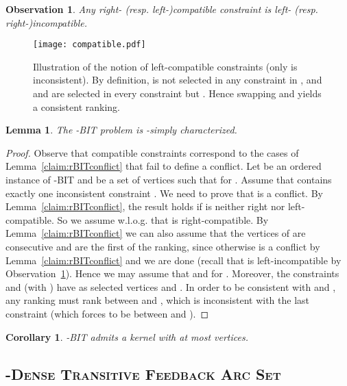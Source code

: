 \documentclass[11pt]{article}
\newtheorem{observation}[theorem]{Observation}
\newtheorem{corollary}[theorem]{Corollary}
\newtheorem{lemma}[theorem]{Lemma}
\newcommand{\rFAST}{\textsc{-Dense Transitive Feedback Arc Set}}
\begin{document}
\begin{observation}
\label{obs:comp}
	Any right- (resp. left-)compatible constraint is left- (resp. right-)incompatible. 

\end{observation}

\begin{figure}[t]

	\centerline{\texttt{[image: compatible.pdf]}}
	\caption{Illustration of the notion of left-compatible constraints (only  is inconsistent). By definition, 
	 is not selected in any constraint in , and  and  are selected in every constraint but . Hence swapping  and  yields a consistent ranking. \label{fig:compatible}}
\end{figure}

\begin{lemma}
\label{lem:rBITdoubleconflict}
	The {\sc -BIT} problem is -simply characterized.
\end{lemma}

\begin{proof} 	Observe that compatible constraints correspond to the cases of 
Lemma~\ref{claim:rBITconflict} that fail to define a conflict. 
Let  be an ordered instance of {\sc -BIT} and  be a set of  vertices such that 
	 for . Assume that  contains exactly 
	one inconsistent constraint . We need to prove that  is a conflict. By Lemma~\ref{claim:rBITconflict}, the result holds if  is neither right nor left-compatible. So we assume w.l.o.g. that  is right-compatible. By Lemma~\ref{claim:rBITconflict} we can also assume that the vertices of  are consecutive and are the first of the ranking, since  otherwise  is a conflict by Lemma~\ref{claim:rBITconflict} and we are done (recall that  is left-incompatible by Observation~\ref{obs:comp}). Hence we may assume that  and  for . Moreover, the constraints  and  (with ) have as selected vertices  and . 
In order to be consistent with  and , any ranking  must rank  
between  and , which is inconsistent with the last constraint (which forces  to be between  
and ). 
\end{proof}
\vspace{0.2cm}

\begin{corollary}
\label{thm:kernelrBIT}
	-BIT admits a kernel with at most  vertices.
\end{corollary}

\subsection{{\sc \rFAST{}}} 
\label{subsec:rfast}
\end{document}
